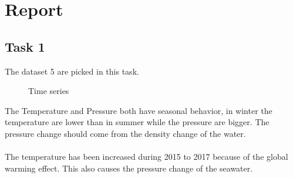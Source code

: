 \chapter*{Report}
\section*{Task 1}
The dataset 5 are picked in this task. 
\begin{figure}[ht]\centering
	\caption{Time series}
\end{figure}
The Temperature and Pressure both have seasonal behavior, in winter the temperature are lower than in summer while the pressure are bigger. The pressure change should come from the density change of the water. \\\\
The temperature has been increased during 2015 to 2017 because of the global warming effect. This also causes the pressure change of the seawater.
